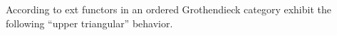 \documentclass[11pt]{article}
\theoremstyle{plain}
\newtheorem{proposition}[lemma]{Proposition}
\theoremstyle{nonumberplain}
\theoremstyle{plain}
\numberwithin{equation}{section}
\theoremstyle{nonumberplain}
\newtheorem{proof}{Proof}
\newcommand\bC{{\mathbb C}}
\newcommand\1{{\bf 1}}
\begin{document}

According to \cite[Proposition 2.9]{us0} ext functors in an ordered Grothendieck category exhibit the following ``upper triangular'' behavior.
\end{document}
